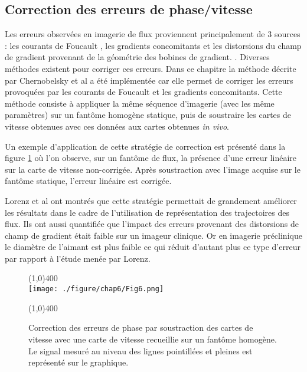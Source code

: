 \subsection{Correction des erreurs de phase/vitesse}

Les erreurs observées en imagerie de flux proviennent principalement de 3 sources : les courants de Foucault \cite{Walker:1993aa}, les gradients concomitants \cite{Bernstein:1998aa} et les distorsions du champ de gradient provenant de la géométrie des bobines de gradient. \cite{Markl:2003aa}. Diverses méthodes existent pour corriger ces erreurs. Dans ce chapitre la méthode décrite par Chernobelsky et al \cite{Chernobelsky:2007aa} a été implémentée car elle permet de corriger les erreurs provoquées par les courants de Foucault et les gradients concomitants. Cette méthode consiste à appliquer la même séquence d'imagerie (avec les même paramètres) sur un fantôme homogène statique, puis de soustraire les cartes de vitesse obtenues avec ces données aux cartes obtenues \textit{in vivo}. 

Un exemple d'application de cette stratégie de correction est présenté dans la figure \ref{fig:CorrectionPhase} où l'on observe, sur un fantôme de flux, la présence d'une erreur linéaire sur la carte de vitesse non-corrigée. Après soustraction avec l'image acquise sur le fantôme statique, l'erreur linéaire est corrigée.%

Lorenz et al \cite{Lorenz:2014aa} ont montrés que cette stratégie permettait de grandement améliorer les résultats dans le cadre de l'utilisation de représentation des trajectoires des flux. Ils ont aussi quantifiée que l'impact des erreurs provenant des distorsions de champ de gradient était faible sur un imageur clinique. Or en imagerie préclinique le diamètre de l'aimant est plus faible ce qui réduit d'autant plus ce type d'erreur par rapport à l'étude menée par Lorenz.

\begin{figure}[H]
\centering
\line(1,0){400} \\
\texttt{[image: ./figure/chap6/Fig6.png]}
\caption[Correction de la phase]{\label{fig:CorrectionPhase} Correction des erreurs de phase par soustraction des cartes de vitesse avec une carte de vitesse recueillie sur un fantôme homogène. Le signal mesuré au niveau des lignes pointillées et pleines est représenté sur le graphique.}
\line(1,0){400} \\ 
\end{figure}

